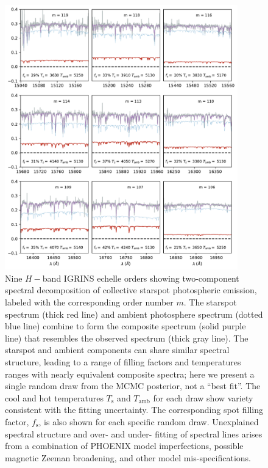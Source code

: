 \documentclass[modern,trackchanges]{aastex631}
\begin{document}
\begin{figure}[ht]
 \centering
 \includegraphics[width=0.90\textwidth]{figures/H_band_spectra_3x3.pdf}
 \caption{Nine $H-$band IGRINS echelle orders showing two-component spectral decomposition of collective starspot photospheric emission, labeled with the corresponding order number $m$.  The starspot spectrum (thick red line) and ambient photosphere spectrum (dotted blue line) combine to form the composite spectrum (solid purple line) that resembles the observed spectrum (thick gray line).  The starspot and ambient components can share similar spectral structure, leading to a range of filling factors and temperatures ranges with nearly equivalent composite spectra; here we present a single random draw from the MCMC posterior, not a ``best fit''.  The cool and hot temperatures $T_{\textrm{s}}$ and $T_{\textrm{amb}}$ for each draw show variety consistent with the fitting uncertainty. The corresponding spot filling factor, $f_{\textrm{s}}$, is also shown for each specific random draw. Unexplained spectral structure and over- and under- fitting of spectral lines arises from a combination of PHOENIX model imperfections, possible magnetic Zeeman broadening, and other model mis-specifications.}
 \label{fig:IGRINS_spectra3x3}
\end{figure}
\end{document}
